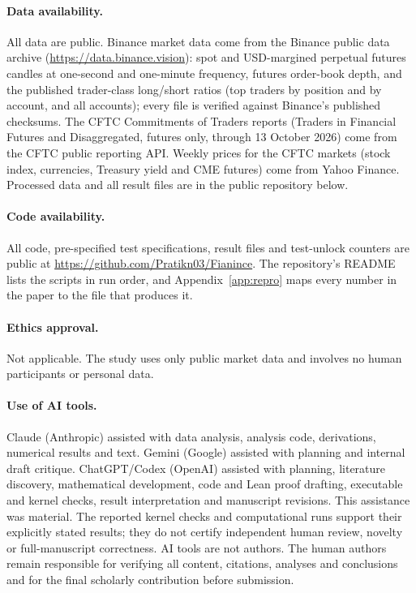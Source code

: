 \paragraph{Data availability.} All data are public. Binance market data come from the Binance public data archive (\url{https://data.binance.vision}): spot and USD-margined perpetual futures candles at one-second and one-minute frequency, futures order-book depth, and the published trader-class long/short ratios (top traders by position and by account, and all accounts); every file is verified against Binance's published checksums. The CFTC Commitments of Traders reports (Traders in Financial Futures and Disaggregated, futures only, through 13 October 2026) come from the CFTC public reporting API. Weekly prices for the CFTC markets (stock index, currencies, Treasury yield and CME futures) come from Yahoo Finance. Processed data and all result files are in the public repository below.

\paragraph{Code availability.} All code, pre-specified test specifications, result files and test-unlock counters are public at \url{https://github.com/Pratikn03/Fianince}. The repository's README lists the scripts in run order, and Appendix~\ref{app:repro} maps every number in the paper to the file that produces it.

\paragraph{Ethics approval.} Not applicable. The study uses only public market data and involves no human participants or personal data.

\paragraph{Use of AI tools.} Claude (Anthropic) assisted with data analysis, analysis code, derivations, numerical results and text. Gemini (Google) assisted with planning and internal draft critique. ChatGPT/Codex (OpenAI) assisted with planning, literature discovery, mathematical development, code and Lean proof drafting, executable and kernel checks, result interpretation and manuscript revisions. This assistance was material. The reported kernel checks and computational runs support their explicitly stated results; they do not certify independent human review, novelty or full-manuscript correctness. AI tools are not authors. The human authors remain responsible for verifying all content, citations, analyses and conclusions and for the final scholarly contribution before submission.

